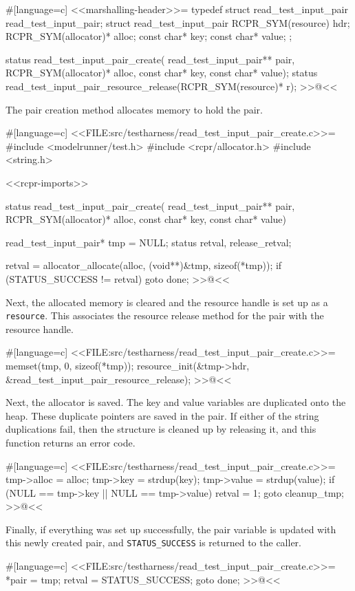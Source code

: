 {#[language=c]
<<marshalling-header>>=
typedef struct read_test_input_pair read_test_input_pair;
struct read_test_input_pair
{
    RCPR_SYM(resource) hdr;
    RCPR_SYM(allocator)* alloc;
    const char* key;
    const char* value;
};

status read_test_input_pair_create(
    read_test_input_pair** pair, RCPR_SYM(allocator)* alloc, const char* key,
    const char* value);
status read_test_input_pair_resource_release(RCPR_SYM(resource)* r);
>>@<<

The pair creation method allocates memory to hold the pair.

#[language=c]
<<FILE:src/testharness/read_test_input_pair_create.c>>=
#include <modelrunner/test.h>
#include <rcpr/allocator.h>
#include <string.h>

<<rcpr-imports>>

status read_test_input_pair_create(
    read_test_input_pair** pair, RCPR_SYM(allocator)* alloc, const char* key,
    const char* value)
{
    read_test_input_pair* tmp = NULL;
    status retval, release_retval;

    retval = allocator_allocate(alloc, (void**)&tmp, sizeof(*tmp));
    if (STATUS_SUCCESS != retval)
    {
        goto done;
    }
>>@<<

Next, the allocated memory is cleared and the resource handle is set up as a
\verb/resource/.  This associates the resource release method for the pair with
the resource handle.

#[language=c]
<<FILE:src/testharness/read_test_input_pair_create.c>>=
    memset(tmp, 0, sizeof(*tmp));
    resource_init(&tmp->hdr, &read_test_input_pair_resource_release);
>>@<<

Next, the allocator is saved.  The key and value variables are duplicated onto
the heap. These duplicate pointers are saved in the pair. If either of the
string duplications fail, then the structure is cleaned up by releasing it, and
this function returns an error code.

#[language=c]
<<FILE:src/testharness/read_test_input_pair_create.c>>=
    tmp->alloc = alloc;
    tmp->key = strdup(key);
    tmp->value = strdup(value);
    if (NULL == tmp->key || NULL == tmp->value)
    {
        retval = 1;
        goto cleanup_tmp;
    }
>>@<<

Finally, if everything was set up successfully, the pair variable is updated
with this newly created pair, and \verb/STATUS_SUCCESS/ is returned to the
caller.

#[language=c]
<<FILE:src/testharness/read_test_input_pair_create.c>>=
    *pair = tmp;
    retval = STATUS_SUCCESS;
    goto done;
>>@<<

}}
